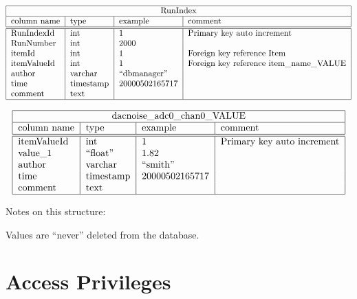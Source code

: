 \documentclass[12pt]{article}
\newcommand{\bdesc}{\begin{description}}
\newcommand{\edesc}{\end{description}}
\begin{document}
\begin{table}
$$
\begin{tabular}{|l|l|l|l|} \hline
\multicolumn{4}{|c|}{RunIndex} \\
\hline
column name & type & example & comment\\
\hline\hline
RunIndexId     & int        & 1       & Primary key auto increment\\
RunNumber      & int        & 2000   &  \\
itemId         & int        & 1       & Foreign key reference Item\\
itemValueId    & int        & 1       & Foreign key reference item\_name\_VALUE\\
author         & varchar     & ``dbmanager''            & \\
time           & timestamp  & 20000502165717        & \\ 
comment        & text       &                       & \\
\hline
\end{tabular}
$$


$$
\begin{tabular}{|l|l|l|l|} \hline
\multicolumn{4}{|c|}{dacnoise\_adc0\_chan0\_VALUE} \\
\hline
column name & type & example & comment\\
\hline\hline
itemValueId    & int        &  1       & Primary key auto increment\\
value\_1       & ``float''   &  1.82    &  \\
author         & varchar    & ``smith''& \\
time           & timestamp  & 20000502165717 & \\ 
comment        & text       &                & \\
\hline
\end{tabular}
$$

\caption{Functional tables.}\label{databasetables}
\end{table}




Notes on this structure:

\bdesc

\item[Values are ``never'' deleted from the database.] 

\edesc

\section{Access Privileges}
\end{document}
